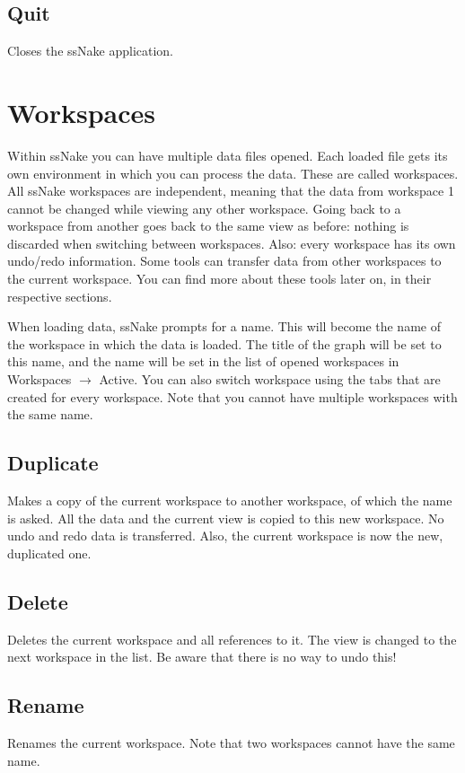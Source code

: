\documentclass[11pt,a4paper]{article}
\begin{document}
\subsection{Quit}
Closes the ssNake application.

\section{Workspaces}
Within ssNake you can have multiple data files opened. Each loaded file gets its own environment in which you can process the data. These are called workspaces. All ssNake workspaces are independent, meaning that the data from workspace 1 cannot be changed while viewing any other workspace. Going back to a workspace from another goes back to the same view as before:  nothing is discarded when switching between workspaces. Also: every workspace has its own undo/redo information. Some tools can transfer data from other workspaces to the current workspace. You can find more about these tools later on, in their respective sections.

When loading data, ssNake prompts for a name. This will become the name of the workspace in which the data is loaded. The title of the graph will be set to this name, and the name will be set in the list of opened workspaces in Workspaces $\rightarrow$ Active. You can also switch workspace using the tabs that are created for every workspace. Note that you cannot have multiple workspaces with the same name.

\subsection{Duplicate}
Makes a copy of the current workspace to another workspace, of which the name is asked. All the data and the current view is copied to this new workspace. No undo and redo data is transferred. Also, the current workspace is now the new, duplicated one.

\subsection{Delete}
Deletes the current workspace and all references to it. The view is changed to the next workspace in the list. Be aware that there is no way to undo this!

\subsection{Rename}
Renames the current workspace. Note that two workspaces cannot have the same name.
\end{document}
